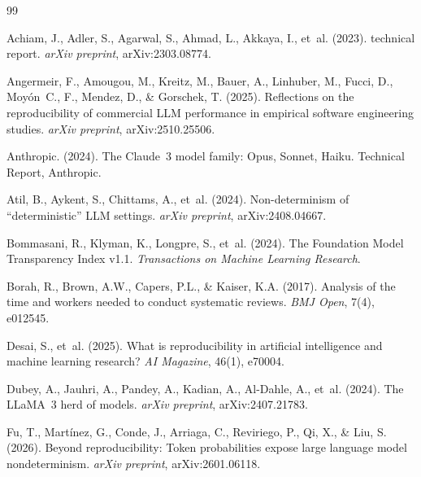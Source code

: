 \documentclass[12pt, a4paper]{article}
\begin{document}


\begin{thebibliography}{99}

Achiam, J., Adler, S., Agarwal, S., Ahmad, L., Akkaya, I., et~al. (2023).
 technical report.
\newblock \emph{arXiv preprint}, arXiv:2303.08774.

Angermeir, F., Amougou, M., Kreitz, M., Bauer, A., Linhuber, M., Fucci, D., Moy\'on~C., F., Mendez, D., \& Gorschek, T. (2025).
\newblock Reflections on the reproducibility of commercial {LLM} performance in empirical software engineering studies.
\newblock \emph{arXiv preprint}, arXiv:2510.25506.

{Anthropic}. (2024).
\newblock The {Claude~3} model family: {Opus}, {Sonnet}, {Haiku}.
\newblock Technical Report, Anthropic.

Atil, B., Aykent, S., Chittams, A., et~al. (2024).
\newblock Non-determinism of ``deterministic'' LLM settings.
\newblock \emph{arXiv preprint}, arXiv:2408.04667.

Bommasani, R., Klyman, K., Longpre, S., et~al. (2024).
\newblock The Foundation Model Transparency Index v1.1.
\newblock \emph{Transactions on Machine Learning Research}.

Borah, R., Brown, A.W., Capers, P.L., \& Kaiser, K.A. (2017).
\newblock Analysis of the time and workers needed to conduct systematic reviews.
\newblock \emph{BMJ Open}, 7(4), e012545.

Desai, S., et~al. (2025).
\newblock What is reproducibility in artificial intelligence and machine learning research?
\newblock \emph{AI Magazine}, 46(1), e70004.

Dubey, A., Jauhri, A., Pandey, A., Kadian, A., Al-Dahle, A., et~al. (2024).
\newblock The {LLaMA}~3 herd of models.
\newblock \emph{arXiv preprint}, arXiv:2407.21783.

Fu, T., Mart\'inez, G., Conde, J., Arriaga, C., Reviriego, P., Qi, X., \& Liu, S. (2026).
\newblock Beyond reproducibility: Token probabilities expose large language model nondeterminism.
\newblock \emph{arXiv preprint}, arXiv:2601.06118.


\end{thebibliography}
\end{document}
